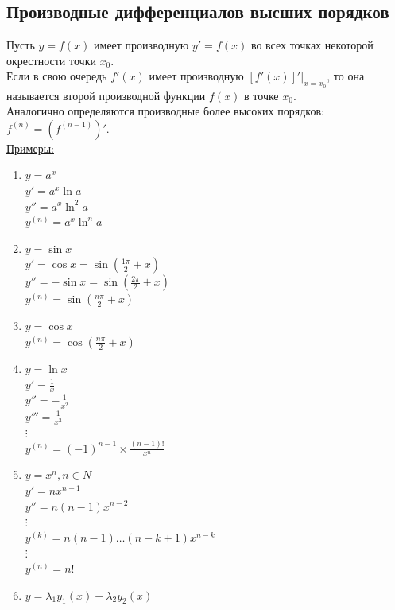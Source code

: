 \documentclass[12pt]{article}
\begin{document}
    \subsection{Производные дифференциалов высших порядков}
    \noindent Пусть $y = f(x)$ имеет производную $y' = f(x)$ во всех точках некоторой окрестности точки $x_0$.\\
    Если в свою очередь $f'(x)$ имеет производную $[f'(x)]'\Big|_{x=x_0}$, то она называется второй производной функции $f(x)$ в точке $x_0$.\\
    Аналогично определяются производные более высоких порядков: $f^{(n)} = (f^{(n-1)})'$.\\
    \underline{Примеры:}
    \begin{enumerate}
        \item $y = a^x$\\
        $y' = a^x \ln a$\\
        $y'' = a^x \ln^2 a$\\
        $y^{(n)} = a^x \ln^n a$
        \item $y = \sin x$\\
        $y' = \cos x = \sin (\frac{1 \pi}{2} + x)$\\
        $y'' = - \sin x = \sin (\frac{2 \pi}{2} + x)$\\
        $y^{(n)} = \sin (\frac{n \pi}{2} + x)$
        \item $y = \cos x$\\
        $y^{(n)} = \cos (\frac{n \pi}{2} + x)$
        \item $y = \ln x$\\
        $y' = \frac{1}{x}$\\
        $y'' = -\frac{1}{x^2}$\\
        $y''' = \frac{1}{x^3}$\\
        $\vdots$\\
        $y^{(n)} = (-1)^{n-1} \times \frac{(n-1)!}{x^n}$
        \item $y = x^n, n \in N$\\
        $y' = nx^{n-1}$\\
        $y'' = n(n-1)x^{n-2}$\\
        $\vdots$\\
        $y^{(k)} = n(n-1)\dots(n-k+1)x^{n-k}$\\
        $\vdots$\\
        $y^{(n)} = n!$
        \item $y = \lambda_1 y_1(x) + \lambda_2 y_2(x)$\\

\end{enumerate}
\end{document}
